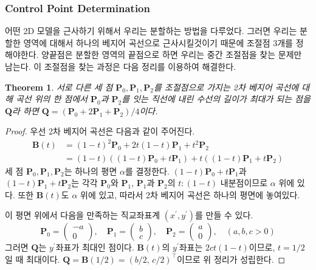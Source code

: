 \documentclass{gshs_thesis}
\theoremstyle{theorem}
\newtheorem{theorem}{Theorem}[section]
\theoremstyle{lemma}
\theoremstyle{definition}
\begin{document}
\subsubsection{Control Point Determination}
어떤 2D 모델을 근사하기 위해서 우리는 분할하는 방법을 다루었다. 그러면 우리는 분할한 영역에 대해서 하나의 베지어 곡선으로 근사시킬것이기 때문에 조절점 3개를 정해야한다. 양끝점은 분할한 영역의 끝점으로 하면 우리는 중간 조절점을 찾는 문제만 남는다. 이 조절점을 찾는 과정은 다음 정리를 이용하여 해결한다.
\begin{theorem}\label{BCmiddle}
	서로 다른 세 점 $\textbf{P}_{0},\textbf{P}_{1},\textbf{P}_{2}$를 조절점으로 가지는 2차 베지어 곡선에 대해 곡선 위의 한 점에서 $\textbf{P}_{0}$과 $\textbf{P}_{2}$를 잇는 직선에 내린 수선의 길이가 최대가 되는 점을 $\textbf{Q}$라 하면 $\textbf{Q}=(\textbf{P}_{0}+2\textbf{P}_{1}+\textbf{P}_{2})/4$이다.
\end{theorem}
\begin{proof}
		우선 2차 베지어 곡선은 다음과 같이 주어진다. 
		\begin{align*}
			\mathbf{B}(t) &= (1-t)^2 \mathbf{P}_0 + 2t(1-t) \mathbf{P}_1 + t^2 \mathbf{P}_2 \\
			&= (1-t)((1-t)\mathbf{P}_0 + t\mathbf{P}_1) + t((1-t)\mathbf{P}_1 + t\mathbf{P}_2)
		\end{align*}
		세 점 $\mathbf{P}_0, \mathbf{P}_1, \mathbf{P}_2$는 하나의 평면 $\alpha$를 결정한다. $(1-t)\mathbf{P}_0 + t\mathbf{P}_1$과 $(1-t)\mathbf{P}_1 + t \mathbf{P}_2$는 각각 $\mathbf{P}_0$와 $\mathbf{P}_1$, $\mathbf{P}_1$과 $\mathbf{P}_2$의 $t \colon (1-t)$ 내분점이므로 $\alpha$ 위에 있다. 또한 $\mathbf{B}(t)$도 $\alpha$ 위에 있고, 따라서 2차 베지어 곡선은 하나의 평면에 놓여있다. 
		
		이 평면 위에서 다음을 만족하는 직교좌표계 $(x^\prime, y^\prime)$를 만들 수 있다.
		$$ \mathbf{P}_0 = \begin{pmatrix} -a \\ 0 \end{pmatrix}, \quad \mathbf{P}_1 = \begin{pmatrix} b \\ c \end{pmatrix}, \quad \mathbf{P}_2 = \begin{pmatrix} a \\ 0 \end{pmatrix}, \quad (a, b, c > 0) $$
		그러면 $\mathbf{Q}$는 $y^\prime$좌표가 최대인 점이다. $\mathbf{B}(t)$의 $y^\prime$좌표는 $2ct(1-t)$이므로, $t = 1/2$일 때 최대이다. $\mathbf{Q} = \mathbf{B}(1/2) = (b/2, \, c/2)^\intercal$이므로 위 정리가 성립한다. 
\end{proof}
\end{document}
